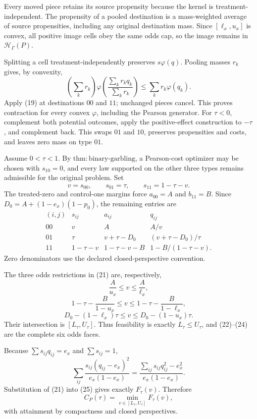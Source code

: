 Every moved piece retains its source propensity because the kernel is treatment-independent. The propensity of a pooled destination is a mass-weighted average of source propensities, including any original destination mass. Since \([\ell_x,u_x]\) is convex, all positive image cells obey the same odds cap, so the image remains in \(\mathcal H_\Gamma(P)\).

Splitting a cell treatment-independently preserves \(s\varphi(q)\). Pooling masses \(r_k\) gives, by convexity,
\[
\left(\sum_kr_k\right)\varphi\left(\frac{\sum_kr_kq_k}{\sum_kr_k}\right)
\leq\sum_kr_k\varphi(q_k). \tag{19}
\]
Apply (19) at destinations \(00\) and \(11\); unchanged pieces cancel. This proves contraction for every convex \(\varphi\), including the Pearson generator. For \(\tau<0\), complement both potential outcomes, apply the positive-effect construction to \(-\tau\), and complement back. This swaps \(01\) and \(10\), preserves propensities and costs, and leaves zero mass on type \(01\).

Assume \(0<\tau<1\). By \(\mathrm{thm{:}binary\mbox{-}garbling}\), a Pearson-cost optimizer may be chosen with \(s_{10}=0\), and every law supported on the other three types remains admissible for the original problem. Set
\[
v=s_{00},\qquad s_{01}=\tau,\qquad s_{11}=1-\tau-v. \tag{20}
\]
The treated-zero and control-one margins force \(a_{00}=A\) and \(b_{11}=B\). Since \(D_0=A+(1-e_x)(1-p_0)\), the remaining entries are
\[
\begin{array}{c|c|c|c}
(i,j)&s_{ij}&a_{ij}&q_{ij}\\ \hline
00&v&A&A/v\\
01&\tau&v+\tau-D_0&(v+\tau-D_0)/\tau\\
11&1-\tau-v&1-\tau-v-B&1-B/(1-\tau-v).
\end{array} \tag{21}
\]
Zero denominators use the declared closed-perspective convention.

The three odds restrictions in (21) are, respectively,
\[
\frac{A}{u_x}\leq v\leq\frac{A}{\ell_x}, \tag{22}
\]
\[
1-\tau-\frac{B}{1-u_x}\leq v\leq1-\tau-\frac{B}{1-\ell_x}, \tag{23}
\]
\[
D_0-(1-\ell_x)\tau\leq v\leq D_0-(1-u_x)\tau. \tag{24}
\]
Their intersection is \([L_\tau,U_\tau]\). Thus feasibility is exactly \(L_\tau\leq U_\tau\), and (22)--(24) are the complete six odds faces.

Because \(\sum s_{ij}q_{ij}=e_x\) and \(\sum s_{ij}=1\),
\[
\sum_{ij}\frac{s_{ij}(q_{ij}-e_x)^2}{e_x(1-e_x)}
=\frac{\sum_{ij}s_{ij}q_{ij}^2-e_x^2}{e_x(1-e_x)}. \tag{25}
\]
Substitution of (21) into (25) gives exactly \(F_\tau(v)\). Therefore
\[
C_P(\tau)=\min_{v\in[L_\tau,U_\tau]}F_\tau(v), \tag{26}
\]
with attainment by compactness and closed perspectives.

